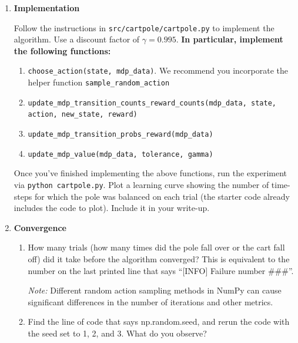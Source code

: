 \begin{enumerate}
  \item {} 
  \textbf{Implementation}

  Follow the instructions in {\tt src/cartpole/cartpole.py} to implement the algorithm. Use a discount factor
  of $\gamma = 0.995$.  \textbf{In particular, implement the following functions:}

\begin{enumerate}
    \item \texttt{choose\_action(state, mdp\_data)}. We recommend you incorporate the helper function \texttt{sample\_random\_action}
    \item \texttt{update\_mdp\_transition\_counts\_reward\_counts(mdp\_data, state, action, new\_state, reward)}
    \item \texttt{update\_mdp\_transition\_probs\_reward(mdp\_data)}
    \item \texttt{update\_mdp\_value(mdp\_data, tolerance, gamma)}
\end{enumerate}

Once you've finished implementing the above functions, run the experiment via {\tt python cartpole.py}. 
Plot a learning curve showing the number of time-steps for which the pole was balanced on each trial (the 
starter code already includes the code to plot). Include it in your write-up.


\ifnum{} {
  
} \fi

  \item {}
  \textbf{Convergence}
    \begin{enumerate}
      \item How many trials (how many times did the pole fall over or the cart fall off) 
            did it take before the algorithm converged? This is equivalent to the number
            on the last printed line that says ``[INFO] Failure number \#\#\#''.
            
            \textit{Note:} Different random action sampling methods in NumPy can cause significant differences in the number of iterations and other metrics.
      \item Find the line of code that says np.random.seed, and rerun the code with the seed set to 1, 2, and 3. 
            What do you observe?
    \end{enumerate}

    
\ifnum{} {
  
} \fi

\end{enumerate}

